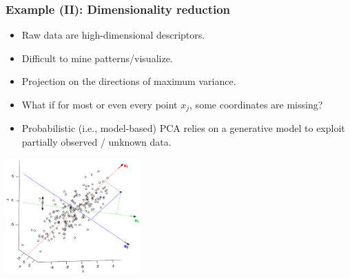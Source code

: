 \documentclass{beamer}
\newcommand{\MN}{{\mathcal N}}
\newcommand{\RR}{\ensuremath{\mathbb{R}}}
\newcommand{\indep}{\perp\!\!\!\perp}
\begin{document}
\begin{frame} \frametitle{Example (II): Dimensionality reduction}


	\begin{itemize}
	\item Raw data are high-dimensional descriptors.
	\item Difficult to mine patterns/visualize.
	\item Projection on the directions of maximum variance.
	\item What if for most or even every point $x_j$, some coordinates 
	 are missing?
	\item Probabilistic (i.e., model-based) PCA relies on a generative model to exploit partially observed / unknown data.
	\end{itemize}
	
	\begin{center}
                \includegraphics[height=4.4cm]{fig/ppca_cloud_axes.pdf}
	\end{center}
\end{frame}
\end{document}
